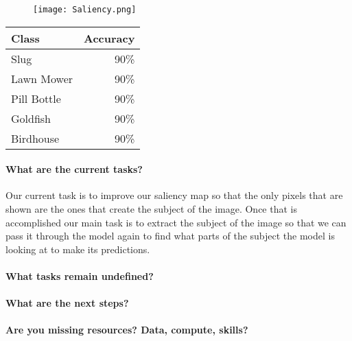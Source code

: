 \begin{figure}[h]
    \centering
    \texttt{[image: Saliency.png]}
\end{figure}

\begin{table}[h]
    \centering
    \begin{tabular}{lr}
        \toprule
        Class & Accuracy\\
        \midrule
        Slug & 90\% \\
        Lawn Mower & 90\% \\
        Pill Bottle & 90\% \\
        Goldfish & 90\% \\
        Birdhouse & 90\% \\
        \bottomrule
    \end{tabular}
\end{table}

\paragraph{What are the current tasks?}
Our current task is to improve our saliency map so that the only pixels that are shown are the ones that create the subject of the image. Once that is accomplished our main task is to extract the subject of the image so that we can pass it through the model again to find what parts of the subject the model is looking at to make its predictions.

\paragraph{What tasks remain undefined?}

\paragraph{What are the next steps?}

\paragraph{Are you missing resources? Data, compute, skills?}

